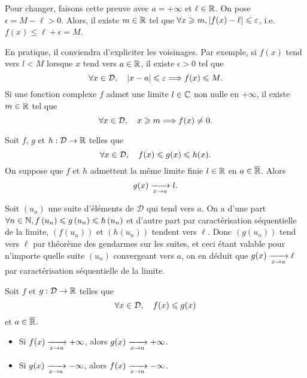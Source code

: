 \documentclass{magnolia}
\begin{document}
\begin{preuve}
Pour changer, faisons cette preuve avec $a=+\infty$ et $\ell \in \mathbb{R}$.
On pose $\epsilon=M-\ell >0$. Alors, il existe $m\in \mathbb{R}$ tel que $\forall x\geqslant m, \left|f(x)-\ell\right|\leqslant \varepsilon$, i.e. $f(x)\leq \ell+\epsilon=M$.
\end{preuve}

\begin{remarques}
\remarque En pratique, il conviendra d'expliciter les voisinages. Par
  exemple, si $f(x)$ tend vers $l<M$ lorsque $x$ tend vers $a\in\mathbb{R}$, il
  existe $\epsilon>0$ tel que
  \[\forall x\in\mathcal{D} ,\quad \left|x-a\right|\leqslant\varepsilon \Longrightarrow
    f(x)\leqslant M.\]
\remarque Si une fonction complexe $f$ admet une limite $l\in\mathbb{C}$
  non nulle en $+\infty$, il existe $m\in\mathbb{R}$ tel que
  \[\forall x\in\mathcal{D} ,\quad x\geqslant m \Longrightarrow f(x)\neq 0.\] 
\end{remarques}

\begin{theoreme}[utile=-3, nom={Théorème des gendarmes}]
Soit $f$, $g$ et $h:\mathcal{D}\to\mathbb{R}$ telles que
\[\forall x\in\mathcal{D} ,\quad f(x)\leqslant g(x)\leqslant h(x).\]
On suppose que $f$ et $h$ admettent la même limite finie $l\in\mathbb{R}$ en $a\in\overline{\mathbb{R}}$.
Alors
\[g(x) \xrightarrow[x\rightarrow a]{} l.\]
\end{theoreme}

\begin{preuve}
Soit $(u_n)$ une suite d'éléments de $\mathcal{D}$ qui tend vers $a$. On a d'une part $\forall n \in \mathbb{N}, f\left(u_n\right)\leqslant g\left(u_n\right)\leqslant h\left(u_n\right)$ et d'autre part par caractérisation séquentielle de la limite, $(f(u_n))$ et $(h(u_n))$ tendent vers $\ell$. Donc $(g(u_n))$ tend vers $\ell$ par théorème des gendarmes sur les suites, et ceci étant valable pour n'importe quelle suite $(u_n)$ convergeant vers $a$, on en déduit que $g(x) \xrightarrow[x\rightarrow a]{} \ell$ par caractérisation séquentielle de la limite.
\end{preuve}


\begin{proposition}[utile=-3]
Soit $f$ et $g:\mathcal{D}\to\mathbb{R}$ telles que
\[\forall x\in\mathcal{D} ,\quad f(x)\leqslant g(x)\]
et $a\in\overline{\mathbb{R}}$.
\begin{itemize}
\item Si $f(x)\xrightarrow[x\rightarrow a]{} +\infty$, alors $g(x)\xrightarrow[x\rightarrow a]{}+\infty$.
\item Si $g(x)\xrightarrow[x\rightarrow a]{} -\infty$, alors $f(x)\xrightarrow[x\rightarrow a]{}-\infty$.
\end{itemize}
\end{proposition}
\end{document}
